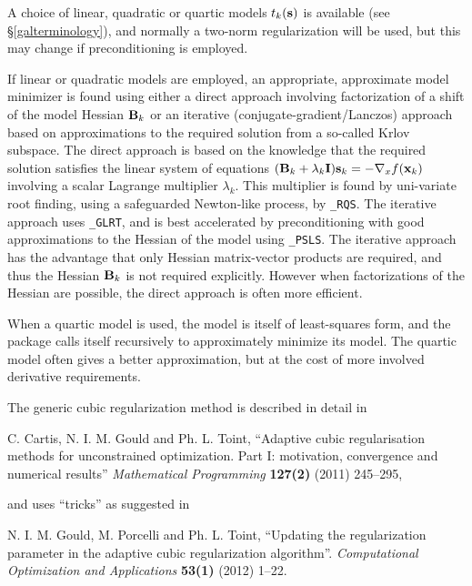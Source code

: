 \documentclass{galahad}
\begin{document}
A choice of linear, quadratic or quartic models $t_k({\mathbf{s}})$ is available
(see \S\ref{galterminology}), and normally a two-norm regularization will
be used, but this may change if preconditioning is employed.

If linear or quadratic models are employed, an appropriate,
approximate model minimizer is found using either a direct approach
involving factorization of a shift of the model Hessian ${\mathbf{B}}_k$ or an
iterative (conjugate-gradient/Lanczos) approach based on approximations
to the required solution from a so-called Krlov subspace. The direct
approach is based on the knowledge that the required solution
satisfies the linear system of equations $({\mathbf{B}}_k + \lambda_k {\mathbf{I}}) {\mathbf{s}}_k
= - \nabla_x f({\mathbf{x}}_k)$ involving a scalar Lagrange multiplier $\lambda_k$.
This multiplier is found by uni-variate root finding, using a safeguarded
Newton-like process, by {\tt \libraryname\_RQS}. The iterative approach
uses {\tt \libraryname\_GLRT}, and is best accelerated by preconditioning
with good approximations to the Hessian of the model using
{\tt \libraryname\_PSLS}. The
iterative approach has the advantage that only Hessian matrix-vector products
are required, and thus the Hessian ${\mathbf{B}}_k$ is not required explicitly.
However when factorizations of the Hessian are possible, the direct approach
is often more efficient.

When a quartic model is used, the model is itself of least-squares form,
and the package calls itself recursively to approximately minimize its
model. The quartic model often gives a better approximation, but at the
cost of more involved derivative requirements.

\vspace*{1mm}

\galreferences
\vspace*{1mm}

\noindent
The generic cubic regularization method is described in detail in
\vspace*{1mm}

\noindent
C. Cartis,  N. I. M. Gould and Ph. L. Toint,
``Adaptive cubic regularisation methods for unconstrained optimization.
Part I: motivation, convergence and numerical results''
{\em Mathematical Programming} {\bf 127(2)} (2011) 245--295,
\vspace*{1mm}

\noindent
and uses ``tricks'' as suggested in
\vspace*{1mm}

\noindent
N. I. M. Gould, M. Porcelli and Ph. L. Toint,
``Updating the regularization parameter in the adaptive cubic regularization
algorithm''.
{\em Computational Optimization and Applications}
{\bf 53(1)} (2012) 1--22.
\end{document}

